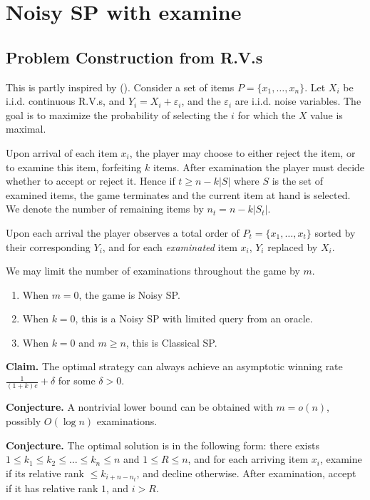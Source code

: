 \section{Noisy SP with examine}
\subsection{Problem Construction from R.V.s}

This is partly inspired by (\cite{kriegerNoisySecretaryProblem2012}). Consider a set of items $P = \{x_1, \ldots, x_n\}$. Let $X_i$ be i.i.d. continuous R.V.s, and $Y_i = X_i + \varepsilon_i$, and the $\varepsilon_i$ are i.i.d. noise variables. The goal is to maximize the probability of selecting the $i$ for which the $X$ value is maximal.

Upon arrival of each item $x_i$, the player may choose to either reject the item, or to examine this item, forfeiting $k$ items. After examination the player must decide whether to accept or reject it. Hence if $t \ge n - k|S|$ where $S$ is the set of examined items, the game terminates and the current item at hand is selected. We denote the number of remaining items by $n_t = n - k |S_t|$.

Upon each arrival the player observes a total order of $P_t = \{x_1,\ldots,x_t\}$ sorted by their corresponding $Y_i$, and for each \textit{examinated} item  $x_i$,  $Y_i$ replaced by $X_i$.

We may limit the number of examinations throughout the game by $m$.
\begin{enumerate}
	\item When $m=0$, the game is Noisy SP.
	\item When $k=0$, this is a Noisy SP with limited query from an oracle.
	\item When $k=0$ and $m\ge  n$, this is Classical SP.
\end{enumerate}

\textbf{Claim.} The optimal strategy can always achieve an asymptotic winning rate $\frac{1}{(1+k)e} + \delta$ for some $\delta > 0$.

\textbf{Conjecture.} A nontrivial lower bound can be obtained with $m = o(n)$, possibly $O(\log n)$ examinations.

\textbf{Conjecture.} The optimal solution is in the following form: there exists $1\le k_1\le k_2 \le \ldots\le k_n \le n$ and $1\le R\le n$, and for each arriving item $x_i$, examine if its relative rank $\le  k_{i+n-n_t}$, and decline otherwise. After examination, accept if it has relative rank $1$, and $i>R$.



